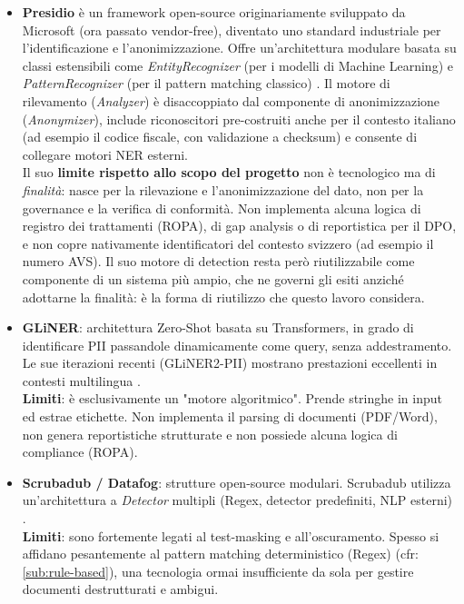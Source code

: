 \begin{itemize}
	\item \textbf{Presidio} è un framework open-source originariamente sviluppato da Microsoft (ora passato vendor-free), diventato uno standard industriale per l'identificazione e l'anonimizzazione. Offre un'architettura modulare basata su classi estensibili come \textit{EntityRecognizer} (per i modelli di Machine Learning) e \textit{PatternRecognizer} (per il pattern matching classico) \cite{HomeMicrosoftPresidio}. Il motore di rilevamento (\textit{Analyzer}) è disaccoppiato dal componente di anonimizzazione (\textit{Anonymizer}), include riconoscitori pre-costruiti anche per il contesto italiano (ad esempio il codice fiscale, con validazione a checksum) e consente di collegare motori NER esterni. \\
	      Il suo \textbf{limite rispetto allo scopo del progetto} non è tecnologico ma di \textit{finalità}: nasce per la rilevazione e l'anonimizzazione del dato, non per la governance e la verifica di conformità. Non implementa alcuna logica di registro dei trattamenti (ROPA), di gap analysis o di reportistica per il DPO, e non copre nativamente identificatori del contesto svizzero (ad esempio il numero AVS). Il suo motore di detection resta però riutilizzabile come componente di un sistema più ampio, che ne governi gli esiti anziché adottarne la finalità: è la forma di riutilizzo che questo lavoro considera.
	\item \textbf{GLiNER}: architettura Zero-Shot basata su Transformers, in grado di identificare PII passandole dinamicamente come query, senza addestramento. Le sue iterazioni recenti (GLiNER2-PII) mostrano prestazioni eccellenti in contesti multilingua \cite{zaratianaGLiNER2PIIMultilingualModel2026}. \\
	      \textbf{Limiti}: è esclusivamente un "motore algoritmico". Prende stringhe in input ed estrae etichette. Non implementa il parsing di documenti (PDF/Word), non genera reportistiche strutturate e non possiede alcuna logica di compliance (ROPA). \cite{zaratianaGLiNERGeneralistModel2024}
	\item \textbf{Scrubadub / Datafog}: strutture open-source modulari. Scrubadub utilizza un'architettura a \textit{Detector} multipli (Regex, detector predefiniti, NLP esterni) \cite{LeapBeyondScrubadub2026}. \\
	      \textbf{Limiti}: sono fortemente legati al test-masking e all'oscuramento. Spesso si affidano pesantemente al pattern matching deterministico (Regex) (cfr:\ref{sub:rule-based}), una tecnologia ormai insufficiente da sola per gestire documenti destrutturati e ambigui.
\end{itemize}

